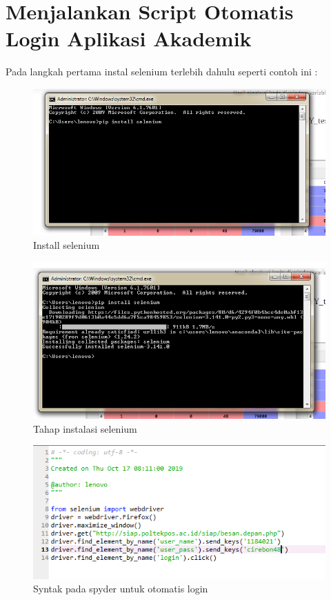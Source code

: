 \section{Menjalankan Script Otomatis Login Aplikasi Akademik}
Pada langkah pertama instal selenium terlebih dahulu seperti contoh ini :

	\begin{figure}
	\includegraphics[scale=0.5]{section/selenium.png}
	\centering
	\caption{Install selenium}
	\end{figure}

	\begin{figure}
	\includegraphics[scale=0.5]{section/proses_selenium}
	\centering
	\caption{Tahap instalasi selenium}
	\end{figure}
	
	\begin{figure}
	\includegraphics[scale=0.5]{section/login_otomatis}
	\centering
	\caption{Syntak pada spyder untuk otomatis login}
	\end{figure}
	
